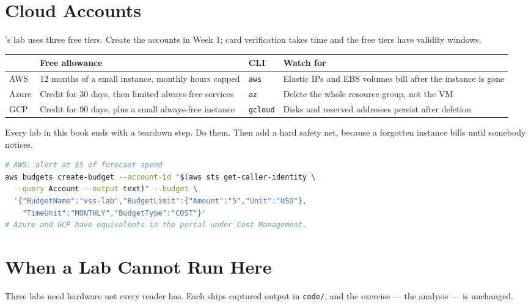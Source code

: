 \section{Cloud Accounts}

's lab uses three free tiers. Create the accounts in Week 1; card
verification takes time and the free tiers have validity windows.

\begin{longtable}{@{}L{2.4cm}L{4.0cm}L{4.0cm}L{4.3cm}@{}}
\toprule
{}
& \textbf{Free allowance} & \textbf{CLI} & \textbf{Watch for} \\
\midrule
\endhead
AWS & 12 months of a small instance, monthly hours capped & \texttt{aws} &
Elastic IPs and EBS volumes bill after the instance is gone \\
Azure & Credit for 30 days, then limited always-free services &
\texttt{az} & Delete the whole resource group, not the VM \\
GCP & Credit for 90 days, plus a small always-free instance &
\texttt{gcloud} & Disks and reserved addresses persist after deletion \\
\bottomrule
\end{longtable}

\begin{alertbox}
Every lab in this book ends with a teardown step. Do them. Then add a hard
safety net, because a forgotten instance bills until somebody notices.
\begin{lstlisting}[language=bash]
# AWS: alert at $5 of forecast spend
aws budgets create-budget --account-id "$(aws sts get-caller-identity \
  --query Account --output text)" --budget \
  '{"BudgetName":"vss-lab","BudgetLimit":{"Amount":"5","Unit":"USD"},
    "TimeUnit":"MONTHLY","BudgetType":"COST"}'
# Azure and GCP have equivalents in the portal under Cost Management.
\end{lstlisting}
\end{alertbox}

\section{When a Lab Cannot Run Here}

Three labs need hardware not every reader has. Each ships captured output in
\texttt{code/}, and the exercise --- the analysis --- is unchanged.

